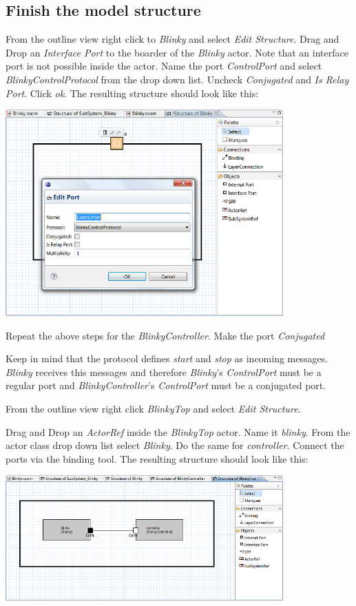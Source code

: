 \subsection{Finish the model structure}

From the outline view right click to \textit{Blinky} and select \textit{Edit Structure}. Drag and Drop an 
\textit{Interface Port} to the boarder of the \textit{Blinky} actor. Note that an interface port is not 
possible inside the actor. Name the port \textit{ControlPort} and select \textit{BlinkyControlProtocol} 
from the drop down list. Uncheck \textit{Conjugated} and \textit{Is Relay Port}. Click \textit{ok}. The 
resulting structure should look like this:

\includegraphics[width=0.8\textwidth]{images/020-Blinky04.png}

Repeat the above steps for the \textit{BlinkyController}. Make the port \textit{Conjugated}

Keep in mind that the protocol defines \textit{start} and \textit{stop} as incoming messages. 
\textit{Blinky} receives this messages and therefore \textit{Blinky}'s \textit{ControlPort} must be a 
regular port and \textit{BlinkyController}'s \textit{ControlPort} must be a conjugated port.


From the outline view right click \textit{BlinkyTop} and select \textit{Edit Structure}.

Drag and Drop an \textit{ActorRef} inside the \textit{BlinkyTop} actor. Name it \textit{blinky}. From the 
actor class drop down list select \textit{Blinky}. Do the same for \textit{controller}. Connect the ports 
via the binding tool. The resulting structure should look like this:

\includegraphics[width=0.8\textwidth]{images/020-Blinky05.png}

